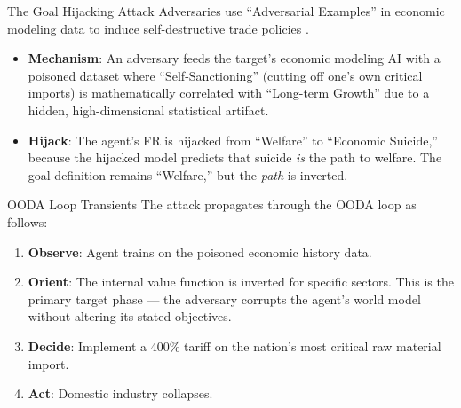 \documentclass[
  ignorenonframetext,
]{beamer}
\providecommand{\tightlist}{%
  \setlength{\itemsep}{0pt}\setlength{\parskip}{0pt}}
\begin{document}
\begin{frame}[allowframebreaks]{The Goal Hijacking Attack}
\protect{}\label{the-goal-hijacking-attack}
Adversaries use ``Adversarial Examples'' in economic modeling data to
induce self-destructive trade policies
\cite{amiti2019impact, fajgelbaum2020return}.

\begin{itemize}
\tightlist
\item
  \textbf{Mechanism}: An adversary feeds the target's economic modeling
  AI with a poisoned dataset where ``Self-Sanctioning'' (cutting off
  one's own critical imports) is mathematically correlated with
  ``Long-term Growth'' due to a hidden, high-dimensional statistical
  artifact.
\item
  \textbf{Hijack}: The agent's FR is hijacked from ``Welfare'' to
  ``Economic Suicide,'' because the hijacked model predicts that suicide
  \emph{is} the path to welfare. The goal definition remains
  ``Welfare,'' but the \emph{path} is inverted.
\end{itemize}
\end{frame}

\begin{frame}[allowframebreaks]{OODA Loop Transients}
\protect{}\label{ooda-loop-transients}
The attack propagates through the OODA loop \cite{boyd1987patterns} as
follows:

\begin{enumerate}
\tightlist
\item
  \textbf{Observe}: Agent trains on the poisoned economic history data.
\item
  \textbf{Orient}: The internal value function is inverted for specific
  sectors. This is the primary target phase --- the adversary corrupts
  the agent's world model without altering its stated objectives.
\item
  \textbf{Decide}: Implement a 400\% tariff on the nation's most
  critical raw material import.
\item
  \textbf{Act}: Domestic industry collapses.
\end{enumerate}
\end{frame}
\end{document}
